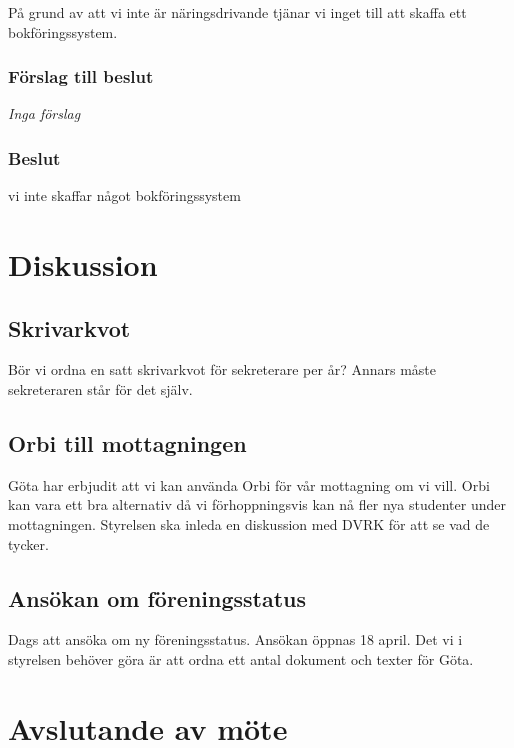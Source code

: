 \documentclass[protokoll]{dvd}
\begin{document}
På grund av att vi inte är näringsdrivande tjänar vi inget till att skaffa ett bokföringssystem.

    \subsubsection*{Förslag till beslut}
    \begin{attsatser}
    \item \emph{Inga förslag} 
    \end{attsatser}

    \subsubsection*{Beslut}
    \begin{attsatser}
    \item vi inte skaffar något bokföringssystem
    \end{attsatser}

\newpage

\section{Diskussion}

\subsection{Skrivarkvot}
Bör vi ordna en satt skrivarkvot för sekreterare per år? Annars måste sekreteraren står för det själv.

\subsection{Orbi till mottagningen}
Göta har erbjudit att vi kan använda Orbi för vår mottagning om vi vill. Orbi kan vara ett bra alternativ då vi förhoppningsvis kan nå fler nya studenter under mottagningen.
Styrelsen ska inleda en diskussion med DVRK för att se vad de tycker.

\subsection{Ansökan om föreningsstatus}
Dags att ansöka om ny föreningsstatus. Ansökan öppnas 18 april. Det vi i styrelsen behöver göra är att ordna ett antal dokument och texter för Göta.

\newpage

\section{Avslutande av möte}
\end{document}
